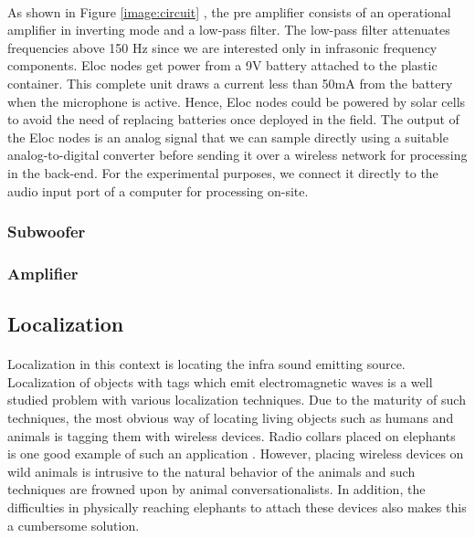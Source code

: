 \documentclass[12pt]{article}
\numberwithin{figure}{section}
\numberwithin{table}{section}
\begin{document}
\paragraph{}
As shown in Figure \ref{image:circuit} , the pre amplifier consists of an operational amplifier in inverting mode and a low-pass filter. The low-pass filter attenuates frequencies above 150 Hz since we are interested only in infrasonic frequency components. Eloc nodes get power from a 9V battery attached to the plastic container. This complete unit draws a current less than 50mA from the battery when the microphone is active. Hence, Eloc nodes could be powered by solar cells to avoid the need of replacing batteries once deployed in the field. The output of the Eloc nodes is an analog signal that we can sample directly using a suitable analog-to-digital converter before sending it over a wireless network for processing in the back-end. For the experimental purposes, we connect it directly to the audio input port of a computer for processing on-site.



\subsubsection{Subwoofer}

\subsubsection{Amplifier}


\newpage

\subsection{Localization}
\paragraph{}
Localization in this context is locating the infra sound emitting source. Localization of objects with tags which emit electromagnetic waves is a well studied problem with various localization techniques. Due to the maturity of such techniques,
the most obvious way of locating living objects such as humans and animals is tagging them with wireless devices. Radio collars placed on elephants is one good example of such an application \cite{32}. However, placing wireless devices on wild animals is intrusive to the natural behavior of the animals and such techniques are frowned upon by animal conversationalists. In addition, the difficulties in physically reaching elephants to attach these devices also makes this a cumbersome solution.
\end{document}
